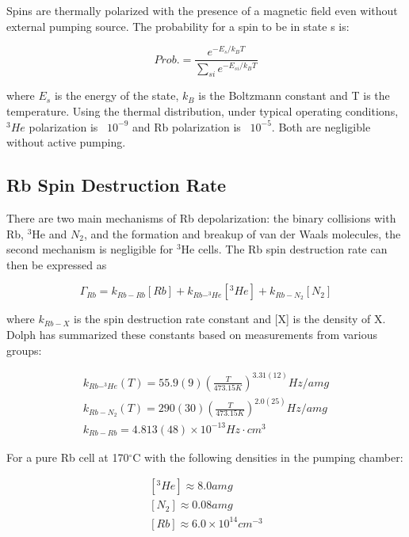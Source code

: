 Spins are thermally polarized with the presence of a magnetic field even without external pumping source. The probability for a spin to be in state s is:

\begin{equation}
Prob. = \frac{e^{-E_{s}/k_{B}T}}{\sum_{si}e^{-E_{si}/k_{B}T}}
\end{equation}

where $E_{s}$ is the energy of the state, $k_{B}$ is the Boltzmann constant and T is the temperature. Using the thermal distribution, under typical operating conditions, $^{3}He$ polarization is ~$10^{-9}$ and Rb polarization is ~$10^{-5}$. Both are negligible without active pumping.

\subsection{Rb Spin Destruction Rate}

There are two main mechanisms of Rb depolarization: the binary collisions with Rb, $^{3}$He and $N_{2}$, and the formation and breakup of van der Waals molecules, the second mechanism is negligible for $^{3}$He cells. The Rb spin destruction rate can then be expressed as

\begin{equation}
\Gamma_{Rb}=k_{Rb-Rb}[Rb]+k_{Rb-^{3}He}[^{3}He]+k_{Rb-N_{2}}[N_{2}]
\end{equation}

where $k_{Rb-X}$ is the spin destruction rate constant and [X] is the density of X. Dolph has summarized these constants based on measurements from various groups:

\begin{subequations}
	\begin{gather}
	k_{Rb-^{3}He}(T)=55.9(9)\left(\frac{T}{473.15K}\right)^{3.31(12)}Hz/amg\\
	k_{Rb-N_{2}}(T)=290(30)\left(\frac{T}{473.15K}\right)^{2.0(25)}Hz/amg\\
	k_{Rb-Rb}=4.813(48)\times 10^{-13}Hz\cdot cm^{3}
	\end{gather}
\end{subequations}

For a pure Rb cell at 170$^{\circ}$C with the following densities in the pumping chamber:

\begin{subequations}
	\begin{gather}
	[^{3}He] \approx 8.0 amg\\
	[N_{2}] \approx 0.08 amg\\
	[Rb] \approx 6.0 \times 10^{14} cm^{-3}
	\end{gather}
\end{subequations}

